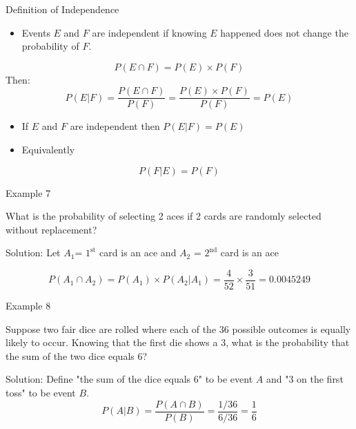 \documentclass[
  ignorenonframetext,
]{beamer}
\providecommand{\tightlist}{%
  \setlength{\itemsep}{0pt}\setlength{\parskip}{0pt}}
\begin{document}
\begin{frame}{Definition of Independence}
\label{definition-of-independence}
\begin{itemize}
\tightlist
\item
  Events \(E\) and \(F\) are independent if knowing \(E\) happened does
  not change the probability of \(F\).
\end{itemize}

\[P( E \cap  F)=P( E)\times P( F)\] Then:
\[P( E|  F)=\frac{P( E \cap  F)}{P( F)}=\frac{P( E)\times P( F)}{P( F)}=P( E)\]

\begin{itemize}
\item
  If \(E\) and \(F\) are independent then \(P( E|  F)=P( E)\)
\item
  Equivalently
\end{itemize}

\[P(F|E)=P( F)\]
\end{frame}

\begin{frame}{Example 7}
\label{example-7}
\begin{tcolorbox}
What is the probability of selecting 2 aces if 2 cards are randomly selected without replacement?
\end{tcolorbox}

\begin{tcolorbox}
Solution:
Let $A_1$= $1^{\text{st}}$ card is an ace and $A_2$ = $2^{\text{nd}}$ card is an ace

$$P(A_1 \cap A_2) = P(A_1)\times P(A_2|A_1) = \frac{4}{52}\times\frac{3}{51} = 0.0045249$$
\end{tcolorbox}
\end{frame}

\begin{frame}{Example 8}
\label{example-8}
\begin{tcolorbox}
Suppose two fair dice are rolled where each of the 36 possible outcomes is equally likely to occur. Knowing that the first die shows a 3, what is the probability that the sum of the two dice equals 6?
\end{tcolorbox}

\begin{tcolorbox}
Solution: 
Define "the sum of the dice equals 6" to be event $A$ and "3 on the first toss" to be event $B$. 
$$P(A|B)=\frac{P(A\cap B)}{P(B)}=\frac{1/36}{6/36}=\frac{1}{6}$$
\end{tcolorbox}
\end{frame}
\end{document}
